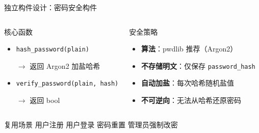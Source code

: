\documentclass[aspectratio=169,UTF8]{ctexbeamer}
\begin{document}
\begin{frame}{独立构件设计：密码安全构件}
    \begin{columns}[T]
        \begin{block}{核心函数}
            \begin{itemize}
                \item \texttt{hash\_password(plain)}

                $\rightarrow$ 返回 Argon2 加盐哈希
                \item \texttt{verify\_password(plain, hash)}

                $\rightarrow$ 返回 bool
            \end{itemize}
        \end{block}
        \begin{block}{安全策略}
            \begin{itemize}
                \item \textbf{算法}：pwdlib 推荐（Argon2）
                \item \textbf{不存储明文}：仅保存 \texttt{password\_hash}
                \item \textbf{自动加盐}：每次哈希随机盐值
                \item \textbf{不可逆向}：无法从哈希还原密码
            \end{itemize}
        \end{block}
    \end{columns}
    \vspace{0.1cm}
    \begin{exampleblock}{复用场景}
        用户注册 \textbullet{} 用户登录 \textbullet{} 密码重置 \textbullet{} 管理员强制改密
    \end{exampleblock}
\end{frame}
\end{document}

